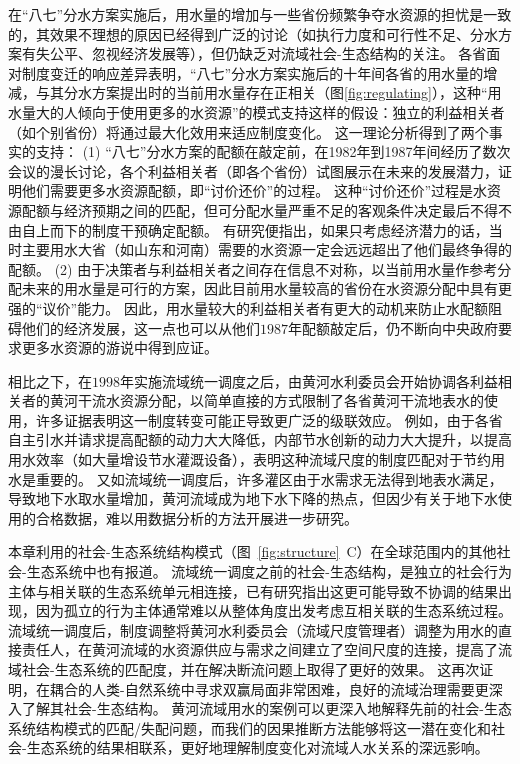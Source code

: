在“八七”分水方案实施后，用水量的增加与一些省份频繁争夺水资源的担忧是一致的，其效果不理想的原因已经得到广泛的讨论（如执行力度和可行性不足、分水方案有失公平、忽视经济发展等），但仍缺乏对流域社会-生态结构的关注。
各省面对制度变迁的响应差异表明，“八七”分水方案实施后的十年间各省的用水量的增减，与其分水方案提出时的当前用水量存在正相关（图\ref{fig:regulating}），这种“用水量大的人倾向于使用更多的水资源”的模式支持这样的假设：独立的利益相关者（如个别省份）将通过最大化效用来适应制度变化。
这一理论分析得到了两个事实的支持：
(1) “八七”分水方案的配额在敲定前，在1982年到1987年间经历了数次会议的漫长讨论，各个利益相关者（即各个省份）试图展示在未来的发展潜力，证明他们需要更多水资源配额，即“讨价还价”的过程\cite{wang2019a, wang2019d}。
这种“讨价还价”过程是水资源配额与经济预期之间的匹配，但可分配水量严重不足的客观条件决定最后不得不由自上而下的制度干预确定配额。
有研究便指出，如果只考虑经济潜力的话，当时主要用水大省（如山东和河南）需要的水资源一定会远远超出了他们最终争得的配额\cite{zuo2020}。
(2) 由于决策者与利益相关者之间存在信息不对称，以当前用水量作参考分配未来的用水量是可行的方案，因此目前用水量较高的省份在水资源分配中具有更强的“议价”能力。
因此，用水量较大的利益相关者有更大的动机来防止水配额阻碍他们的经济发展，这一点也可以从他们$1987$年配额敲定后，仍不断向中央政府要求更多水资源的游说中得到应证\cite{wang2019a, wang2019d}。

相比之下，在$1998$年实施流域统一调度之后，由黄河水利委员会开始协调各利益相关者的黄河干流水资源分配，以简单直接的方式限制了各省黄河干流地表水的使用，许多证据表明这一制度转变可能正导致更广泛的级联效应。
例如，由于各省自主引水并请求提高配额的动力大大降低，内部节水创新的动力大大提升，以提高用水效率（如大量增设节水灌溉设备），表明这种流域尺度的制度匹配对于节约用水是重要的\cite{krieger1955, ostrom1990}。
又如流域统一调度后，许多灌区由于水需求无法得到地表水满足，导致地下水取水量增加，黄河流域成为地下水下降的热点\cite{sun2022b}，但因少有关于地下水使用的合格数据，难以用数据分析的方法开展进一步研究。

本章利用的社会-生态系统结构模式（图~\ref{fig:structure}~C）在全球范围内的其他社会-生态系统中也有报道。
流域统一调度之前的社会-生态结构，是独立的社会行为主体与相关联的生态系统单元相连接，已有研究指出这更可能导致不协调的结果出现，因为孤立的行为主体通常难以从整体角度出发考虑互相关联的生态系统过程\cite{sayles2017,sayles2019,cai2016,bergsten2019}。
流域统一调度后，制度调整将黄河水利委员会（流域尺度管理者）调整为用水的直接责任人，在黄河流域的水资源供应与需求之间建立了空间尺度的连接，提高了流域社会-生态系统的匹配度，并在解决断流问题上取得了更好的效果\cite{cumming2020a,wang2019d}。
这再次证明，在耦合的人类-自然系统中寻求双赢局面非常困难\cite{hegwood2022}，良好的流域治理需要更深入了解其社会-生态结构\cite{bergsten2019, sayles2019}。
黄河流域用水的案例可以更深入地解释先前的社会-生态系统结构模式的匹配/失配问题，而我们的因果推断方法能够将这一潜在变化和社会-生态系统的结果相联系，更好地理解制度变化对流域人水关系的深远影响。

